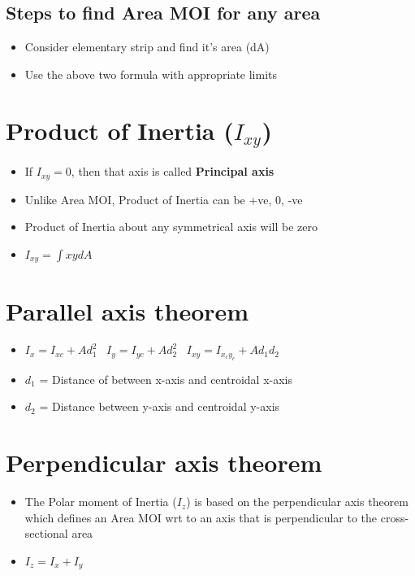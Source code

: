 \documentclass[8pt]{report}
\begin{document}
	\subsection{Steps to find Area MOI for any area}
		\begin{itemize}
			\item Consider elementary strip and find it's area (dA)
			\item Use the above two formula with appropriate limits
		\end{itemize}
	\section{Product of Inertia ($I_{xy}$)}
		\begin{itemize}
			\item If $I_{xy} = 0$, then that axis is called \textbf{Principal axis}
			\item Unlike Area MOI, Product of Inertia can be +ve, 0, -ve
			\item Product of Inertia about any symmetrical axis will be zero
			\item $\boxed{I_{xy} = \int xydA}$
		\end{itemize}\hrulefill
	\section{Parallel axis theorem}
		\begin{itemize}
			\item $\boxed{I_x = I_{xc} + Ad_1^2}\;\;\;\boxed{I_y = I_{yc} + Ad_2^2}\;\;\;\boxed{I_{xy} = I_{x_cy_c}+Ad_1d_2}$ 
			\item $d_1$ = Distance of between x-axis and centroidal x-axis
			\item $d_2$ = Distance between y-axis and centroidal y-axis
		\end{itemize}\hrulefill
	\section{Perpendicular axis theorem}
		\begin{itemize}
			\item The Polar moment of Inertia ($I_z$) is based on the perpendicular axis theorem which defines an Area MOI wrt to an axis that is perpendicular to the cross-sectional area
			\item $\boxed{I_z = I_x + I_y}$
		\end{itemize}\hrulefill
\end{document}
